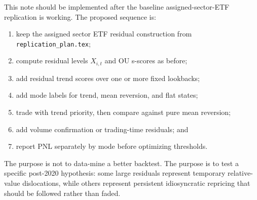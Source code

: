 \documentclass[11pt]{article}
\begin{document}
This note should be implemented after the baseline assigned-sector-ETF
replication is working. The proposed sequence is:
\begin{enumerate}
    \item keep the assigned sector ETF residual construction from
    \texttt{replication\_plan.tex};
    \item compute residual levels $X_{i,t}$ and OU s-scores as before;
    \item add residual trend scores over one or more fixed lookbacks;
    \item add mode labels for trend, mean reversion, and flat states;
    \item trade with trend priority, then compare against pure mean reversion;
    \item add volume confirmation or trading-time residuals; and
    \item report PNL separately by mode before optimizing thresholds.
\end{enumerate}

The purpose is not to data-mine a better backtest. The purpose is to test a
specific post-2020 hypothesis: some large residuals represent temporary
relative-value dislocations, while others represent persistent idiosyncratic
repricing that should be followed rather than faded.
\end{document}
